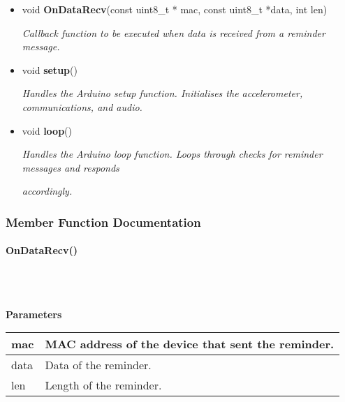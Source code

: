         \begin{itemize}
            \item void \textbf{OnDataRecv}(const uint8\_t * mac, const uint8\_t *data, int len) 
            
                \quad \quad \textit{Callback function to be executed when data is received from a reminder message.}

            \item void \textbf{setup}() 
            
                \quad \quad \textit{Handles the Arduino setup function. Initialises the accelerometer, communications, and audio.}

            \item void \textbf{loop}() 
            
                \quad \quad \textit{Handles the Arduino loop function. Loops through checks for reminder messages and responds }
                
                \quad \quad \textit{accordingly.}\\
        \end{itemize}


    \subsubsection{Member Function Documentation}\mbox{}

        \paragraph{OnDataRecv()}\mbox{}\\

            \\


            \textbf{Parameters}

            \vspace{1em}
            \begin{tabular}{| l | l |} 
                \hline
                mac & MAC address of the device that sent the reminder.\\ 
                \hline
                data & Data of the reminder.\\ 
                \hline
                len & Length of the reminder.\\ 
                \hline
            \end{tabular}\\~\\


